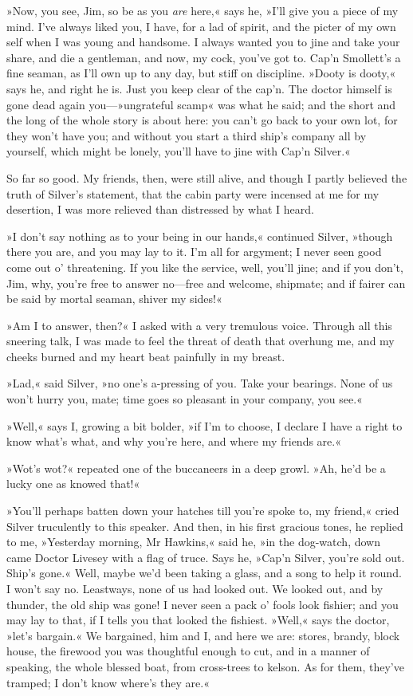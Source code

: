 »Now, you see, Jim, so be as you \textit{are} here,« says he, »I'll give you a piece of my mind. I've always liked you, I have, for a lad of spirit, and the picter of my own self when I was young and handsome. I always wanted you to jine and take your share, and die a gentleman, and now, my cock, you've got to. Cap'n Smollett's a fine seaman, as I'll own up to any day, but stiff on discipline. »Dooty is dooty,« says he, and right he is. Just you keep clear of the cap'n. The doctor himself is gone dead again you—»ungrateful scamp« was what he said; and the short and the long of the whole story is about here: you can't go back to your own lot, for they won't have you; and without you start a third ship's company all by yourself, which might be lonely, you'll have to jine with Cap'n Silver.«

So far so good. My friends, then, were still alive, and though I partly believed the truth of Silver's statement, that the cabin party were incensed at me for my desertion, I was more relieved than distressed by what I heard.

»I don't say nothing as to your being in our hands,« continued Silver, »though there you are, and you may lay to it. I'm all for argyment; I never seen good come out o' threatening. If you like the service, well, you'll jine; and if you don't, Jim, why, you're free to answer no—free and welcome, shipmate; and if fairer can be said by mortal seaman, shiver my sides!«

»Am I to answer, then?« I asked with a very tremulous voice. Through all this sneering talk, I was made to feel the threat of death that overhung me, and my cheeks burned and my heart beat painfully in my breast.

»Lad,« said Silver, »no one's a-pressing of you. Take your bearings. None of us won't hurry you, mate; time goes so pleasant in your company, you see.«

»Well,« says I, growing a bit bolder, »if I'm to choose, I declare I have a right to know what's what, and why you're here, and where my friends are.«

»Wot's wot?« repeated one of the buccaneers in a deep growl. »Ah, he'd be a lucky one as knowed that!«

»You'll perhaps batten down your hatches till you're spoke to, my friend,« cried Silver truculently to this speaker. And then, in his first gracious tones, he replied to me, »Yesterday morning, Mr Hawkins,« said he, »in the dog-watch, down came Doctor Livesey with a flag of truce. Says he, »Cap'n Silver, you're sold out. Ship's gone.« Well, maybe we'd been taking a glass, and a song to help it round. I won't say no. Leastways, none of us had looked out. We looked out, and by thunder, the old ship was gone! I never seen a pack o' fools look fishier; and you may lay to that, if I tells you that looked the fishiest. »Well,« says the doctor, »let's bargain.« We bargained, him and I, and here we are: stores, brandy, block house, the firewood you was thoughtful enough to cut, and in a manner of speaking, the whole blessed boat, from cross-trees to kelson. As for them, they've tramped; I don't know where's they are.«

